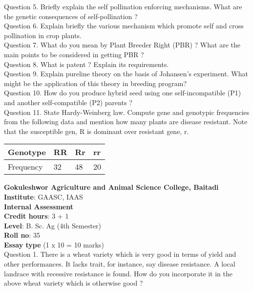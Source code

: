 \documentclass[12pt]{article}\usepackage[]{graphicx}\usepackage[]{color}
\begin{document}
Question 5. Briefly explain the self pollination enforcing mechanisms. What are the genetic consequences of self-pollination ?\\
Question 6. Explain briefly the various mechanism which promote self and cross pollination in crop plants.\\
Question 7. What do you mean by Plant Breeder Right (PBR) ? What are the main points to be considered in getting PBR ?\\
Question 8. What is patent ? Explain its requirements.\\
Question 9. Explain pureline theory on the basis of Johansen's experiment. What might be the application of this theory in breeding program?\\
Question 10. How do you produce hybrid seed using one self-incompatible (P1) and another self-compatible (P2) parents ?\\
Question 11. State Hardy-Weinberg law. Compute gene and genotypic frequencies from the following data and mention how many plants are disease resistant. Note that the susceptible gen, R is dominant over resistant gene, r.\\ 
\begin{table}[H]
\centering\begingroup\fontsize{8}{10}\selectfont

\begin{tabular}[t]{llll}
\toprule
Genotype & RR & Rr & rr\\
\midrule
Frequency & 32 & 48 & 20\\
\bottomrule
\end{tabular}
\endgroup{}
\end{table}
\clearpage 
{\centering \Large{\textbf{Gokuleshwor Agriculture and Animal Science College, Baitadi}} \\[0.25cm]
            \textbf{Institute}: GAASC, IAAS \\[0.2cm]
            \textbf{Internal Assessment} \\[0.2cm]} 
\textbf{Credit hours}: 3 + 1 \\ 
\textbf{Level}: B. Sc. Ag (4th Semester) \\
\textbf{Roll no}: 35 \\[0.5cm] 
\textbf{Essay type} (1 x 10 = 10 marks) \\
Question 1. There is a wheat variety which is very good in terms of yield and other performances. It lacks trait, for instance, say disease resistance. A local landrace with recessive resistance is found. How do you incorporate it in the above wheat variety which is otherwise good ?\\
\end{document}
